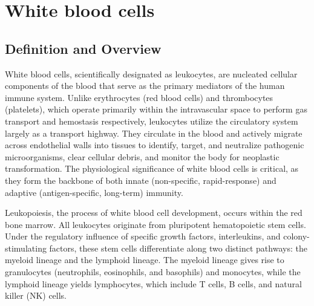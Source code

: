 \chapter{White blood cells}

\section*{Definition and Overview}
White blood cells, scientifically designated as leukocytes, are nucleated cellular components of the blood that serve as the primary mediators of the human immune system. Unlike erythrocytes (red blood cells) and thrombocytes (platelets), which operate primarily within the intravascular space to perform gas transport and hemostasis respectively, leukocytes utilize the circulatory system largely as a transport highway. They circulate in the blood and actively migrate across endothelial walls into tissues to identify, target, and neutralize pathogenic microorganisms, clear cellular debris, and monitor the body for neoplastic transformation. The physiological significance of white blood cells is critical, as they form the backbone of both innate (non-specific, rapid-response) and adaptive (antigen-specific, long-term) immunity.

Leukopoiesis, the process of white blood cell development, occurs within the red bone marrow. All leukocytes originate from pluripotent hematopoietic stem cells. Under the regulatory influence of specific growth factors, interleukins, and colony-stimulating factors, these stem cells differentiate along two distinct pathways: the myeloid lineage and the lymphoid lineage. The myeloid lineage gives rise to granulocytes (neutrophils, eosinophils, and basophils) and monocytes, while the lymphoid lineage yields lymphocytes, which include T cells, B cells, and natural killer (NK) cells.

